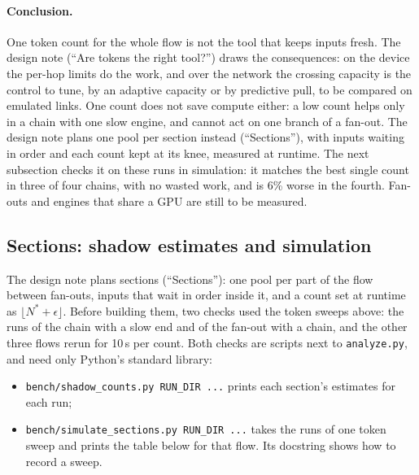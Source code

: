 \documentclass[11pt]{article}
\newcommand{\code}[1]{\texttt{#1}}
\begin{document}
\paragraph{Conclusion.} One token count for the whole flow is not the tool
that keeps inputs fresh. The design note (``Are tokens the right tool?'')
draws the consequences: on the device the per-hop limits do the work, and
over the network the crossing capacity is the control to tune, by an
adaptive capacity or by predictive pull, to be compared on emulated links.
One count does not save compute either: a low count helps only in a chain
with one slow engine, and cannot act on one branch of a fan-out. The design
note plans one pool per section instead (``Sections''), with inputs waiting
in order and each count kept at its knee, measured at runtime. The next
subsection checks it on these runs in simulation: it matches the best single
count in three of four chains, with no wasted work, and is 6\% worse in the
fourth. Fan-outs and engines that share a GPU are still to be measured.

\subsection{Sections: shadow estimates and simulation}

The design note plans sections (``Sections''): one pool per part of the flow
between fan-outs, inputs that wait in order inside it, and a count set at
runtime as $\lfloor N^* + \epsilon\rfloor$. Before building them, two checks
used the token sweeps above: the runs of the chain with a slow end and of
the fan-out with a chain, and the other three flows rerun for 10\,s per
count. Both checks are scripts next to \code{analyze.py}, and need only
Python's standard library:
\begin{itemize}[nosep]
  \item \code{bench/shadow\_counts.py RUN\_DIR ...} prints each section's
        estimates for each run;
  \item \code{bench/simulate\_sections.py RUN\_DIR ...} takes the runs of
        one token sweep and prints the table below for that flow. Its
        docstring shows how to record a sweep.
\end{itemize}
\end{document}
